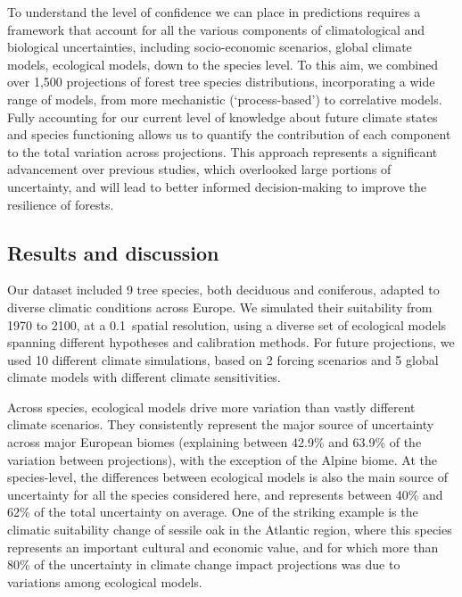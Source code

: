 \documentclass[11pt,letter]{article}
\begin{document}
To understand the level of confidence we can place in predictions requires a framework that account for all the various components of climatological and biological uncertainties, including socio-economic scenarios, global climate models, ecological models, down to the species level. To this aim, we combined over 1,500 projections of forest tree species distributions, incorporating a wide range of models, from more mechanistic (‘process-based’) to correlative models. Fully accounting for our current level of knowledge about future climate states and species functioning allows us to quantify the contribution of each component to the total variation across projections. This approach represents a significant advancement over previous studies, which overlooked large portions of uncertainty, and will lead to better informed decision-making to improve the resilience of forests.


\subsection*{Results and discussion}

Our dataset included 9 tree species, both deciduous and coniferous, adapted to diverse climatic conditions across Europe. We simulated their suitability from 1970 to 2100, at a 0.1\degree~spatial resolution, using a diverse set of ecological models spanning different hypotheses and calibration methods. For future projections, we used 10 different climate simulations, based on 2 forcing scenarios and 5 global climate models with different climate sensitivities.

Across species, ecological models drive more variation than vastly different climate scenarios. They consistently represent the major source of uncertainty across major European biomes (explaining between 42.9\% and 63.9\% of the variation between projections), with the exception of the Alpine biome. At the species-level, the differences between ecological models is also the main source of uncertainty for all the species considered here, and represents between 40\% and 62\% of the total uncertainty on average. One of the striking example is the climatic suitability change of sessile oak in the Atlantic region, where this species represents an important cultural and economic value, and for which more than 80\% of the uncertainty in climate change impact projections was due to variations among ecological models. 
\end{document}
